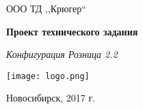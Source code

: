 \begin{titlepage}
  \begin{center}
    \large
  ООО ТД ,,Крюгер``

 
\vspace{2.25cm}

\textbf{Проект технического задания} 

\textit{Конфигурация Розница 2.2}
\vfill    
  
{\texttt{[image: logo.png]}}  
  
\end{center}
\vfill

\newlength{\ML}

\begin{center}
  Новосибирск, 2017 г.
\end{center}
\end{titlepage}